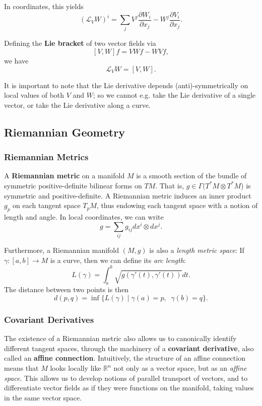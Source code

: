 \documentclass[reqno]{amsart}
\numberwithin{equation}{section}
\begin{document}
In coordinates, this yields
$$
    (\mathcal L_V W)^i = \sum_j V^j \frac{\partial W_i}{\partial x_j} - W^j \frac{\partial V_i}{\partial x_j}.
$$

Defining the \textbf{Lie bracket} of two vector fields via
$$
    [V,W]f = VWf - WVf,
$$
we have
$$
    \mathcal L_V W = [V, W].
$$

It is important to note that the Lie derivative depends (anti)-symmetrically on local values of both $V$ and $W$;
so we cannot e.g. take the Lie derivative of a single vector, or take the Lie derivative along a curve.

\subsection{Riemannian Geometry}
\subsubsection{Riemannian Metrics}

A \textbf{Riemannian metric} on a manifold $M$ is a smooth section of the bundle of
symmetric positive-definite bilinear forms on $TM$. That is, $g \in \Gamma(T^*M \otimes T^*M$) is symmetric and 
positive-definite. A Riemannian metric induces an inner product $g_p$ on each tangent space $T_pM$, thus endowing
each tangent space with a notion of length and angle. In local coordinates, we can write
$$
    g = \sum_{ij} g_{ij} dx^i \otimes dx^j.
$$

Furthermore, a Riemannian manifold $(M, g)$ is also a \emph{length metric space}: If $\gamma : [a,b] \to M$ is
a curve, then we can define its \emph{arc length}:
$$
    L(\gamma) = \int_a^b \sqrt{g(\gamma'(t), \gamma'(t))} dt.
$$
The distance between two points is then
$$
    d(p,q) = \inf\{L(\gamma) \mid \gamma(a) = p, \; \; \gamma(b) = q\}.
$$

\subsubsection{Covariant Derivatives}

The existence of a Riemannian metric also allows us to canonically identify different tangent spaces, through
the machinery of a \textbf{covariant derivative}, also called an
\textbf{affine connection}. Intuitively, the structure of an affine connection means that
$M$ looks locally like $\mathbb R^n$ not only as a vector space, but as an \emph{affine space}. This allows
us to develop notions of parallel transport of vectors, and to differentiate vector fields as if they were functions
on the manifold, taking values in the same vector space.
\end{document}
